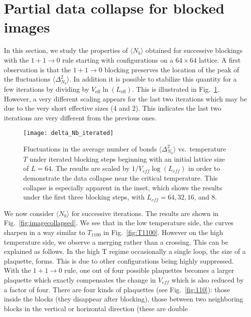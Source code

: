 \documentclass[../main.tex]{subfiles}
\begin{document}
\section{Partial data collapse for blocked images}%
\label{sec:collapse}
In this section, we study the properties of $\langle N_b\rangle$  obtained for
successive blockings with the $1+1\rightarrow0$ rule starting with
configurations on a $64\times64$ lattice.  A first observation is that the
$1+1\rightarrow0$ blocking preserves the location of the peak of the
fluctuations $\langle\Delta_{N_b}^2\rangle$. In addition it is possible to
stabilize this quantity for a few iterations by dividing by
$V_{\text{eff}}\ln(L_{\text{eff}})$. This is illustrated in
Fig.~\ref{fig:delta_Nb_iterated}.  However, a very different scaling appears
for the last two iterations which may be due to the very short effective sizes
(4 and 2).  This indicates the last two iterations are very different from the
previous ones. 
%
\begin{figure}[htpb]
    \centering
    \texttt{[image: delta\_Nb\_iterated]}\hfill
    \caption{Fluctuations in the average number of bonds $\langle
        \Delta_{N_b}^2\rangle$ vs.\ temperature $T$ under iterated blocking
        steps beginning with an initial lattice size of $L = 64$. The results
        are scaled by $1 / V_{eff}\log(L_{eff})$ in order to demonstrate the
        data collapse near the critical temperature. This collapse is
        especially apparent in the inset, which shows the results under the
        first three blocking steps, with $L_{eff} = 64, 32, 16$, and $8$.}%
\label{fig:delta_Nb_iterated}
\end{figure}
%
We now consider $\langle N_b\rangle$  for successive iterations.  The results
are shown in Fig.~\ref{fig:imagecollapsed}. We see that in the low temperature
side, the curves sharpen in a way similar to $T_{1100}$ in
Fig.~\ref{fig:T1100}. However on the high temperature side, we observe a
merging rather than a crossing.  This can be explained as follows.  In the high
T regime occasionally a single loop, the size of a plaquette, forms.  This is
due to other configurations being highly suppressed. With the $1+1\rightarrow0$
rule, one out of four possible plaquettes becomes a larger plaquette which
exactly compensates the change in $V_{eff}$ which is also reduced by a factor
of four.  There are four kinds of plaquettes (see Fig.~\ref{fig:110}): those
inside the blocks (they disappear after blocking), those between two
neighboring blocks in the vertical or horizontal direction (these are double
\end{document}
